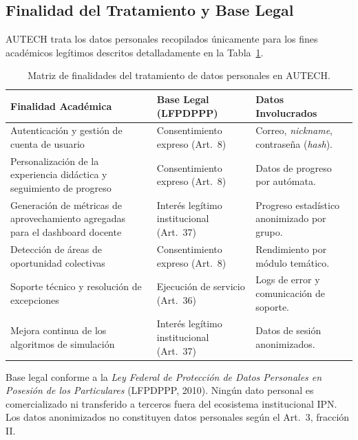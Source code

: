 \clearpage

\subsection{Finalidad del Tratamiento y Base Legal}
\label{subsec:privacidad_finalidades}

AUTECH trata los datos personales recopilados únicamente para los fines académicos legítimos descritos detalladamente en la Tabla~\ref{tab:finalidades_datos}.

\begin{table}[htbp]
\centering
\caption{Matriz de finalidades del tratamiento de datos personales en AUTECH.}
\label{tab:finalidades_datos}
\setlength{\tabcolsep}{4pt}
\renewcommand{\arraystretch}{1.2}
\scriptsize
\begin{tabularx}{\textwidth}{@{} >{\raggedright\arraybackslash}X >{\raggedright\arraybackslash}p{3.8cm} >{\raggedright\arraybackslash}X @{}}
\toprule
\textbf{Finalidad Académica} &
\textbf{Base Legal (LFPDPPP)} &
\textbf{Datos Involucrados} \\
\midrule

Autenticación y gestión de cuenta de usuario
  & Consentimiento expreso (Art.~8)
  & Correo, \textit{nickname}, contraseña (\textit{hash}). \\

Personalización de la experiencia didáctica y seguimiento de progreso
  & Consentimiento expreso (Art.~8)
  & Datos de progreso por autómata. \\

Generación de métricas de aprovechamiento agregadas para el dashboard docente
  & Interés legítimo institucional (Art.~37)
  & Progreso estadístico anonimizado por grupo. \\

Detección de áreas de oportunidad colectivas
  & Consentimiento expreso (Art.~8)
  & Rendimiento por módulo temático. \\

Soporte técnico y resolución de excepciones
  & Ejecución de servicio (Art.~36)
  & Logs de error y comunicación de soporte. \\

Mejora continua de los algoritmos de simulación
  & Interés legítimo institucional (Art.~37)
  & Datos de sesión anonimizados. \\

\bottomrule
\end{tabularx}

\vspace{3pt}
\begin{minipage}{\textwidth}
  \scriptsize
  Base legal conforme a la \textit{Ley Federal de Protección de Datos Personales en
  Posesión de los Particulares} (LFPDPPP, 2010). Ningún dato personal es
  comercializado ni transferido a terceros fuera del ecosistema institucional IPN.
  Los datos anonimizados no constituyen datos personales según el Art.~3, fracción II.
\end{minipage}
\end{table}

